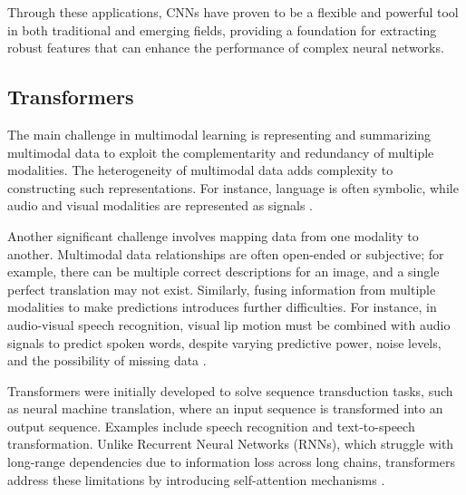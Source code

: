 Through these applications, CNNs have proven to be a flexible and powerful tool in both traditional and emerging fields, providing a foundation for extracting robust features that can enhance the performance of complex neural networks.

\subsection{Transformers}
The main challenge in multimodal learning is representing and summarizing multimodal data to exploit the complementarity and redundancy of multiple modalities. The heterogeneity of multimodal data adds complexity to constructing such representations. For instance, language is often symbolic, while audio and visual modalities are represented as signals \cite{baltruvsaitis2018multimodal}.

Another significant challenge involves mapping data from one modality to another. Multimodal data relationships are often open-ended or subjective; for example, there can be multiple correct descriptions for an image, and a single perfect translation may not exist. Similarly, fusing information from multiple modalities to make predictions introduces further difficulties. For instance, in audio-visual speech recognition, visual lip motion must be combined with audio signals to predict spoken words, despite varying predictive power, noise levels, and the possibility of missing data \cite{baltruvsaitis2018multimodal}.

Transformers were initially developed to solve sequence transduction tasks, such as neural machine translation, where an input sequence is transformed into an output sequence. Examples include speech recognition and text-to-speech transformation. Unlike Recurrent Neural Networks (RNNs), which struggle with long-range dependencies due to information loss across long chains, transformers address these limitations by introducing self-attention mechanisms \cite{vaswani2017attention}.

